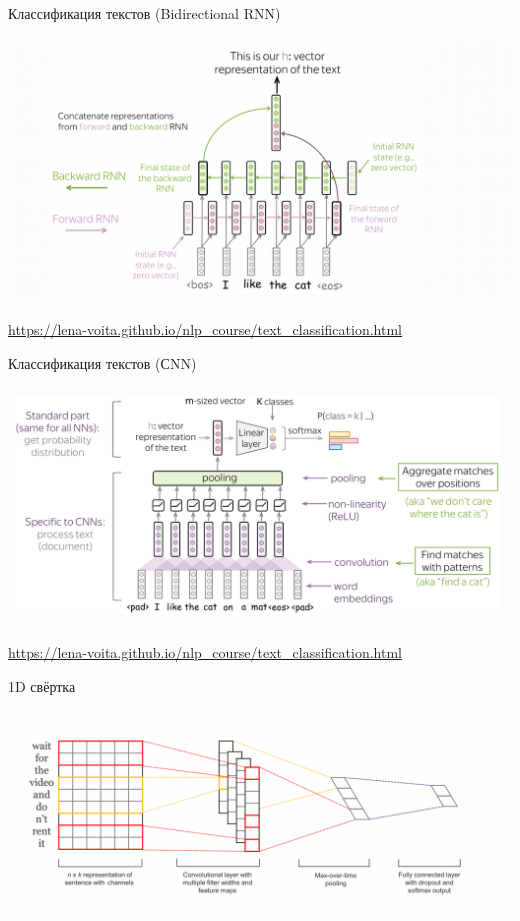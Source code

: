 \documentclass[notes,12pt, aspectratio=169]{beamer}
\begin{document}
\begin{frame}{Классификация текстов (Bidirectional RNN)}
	\begin{center}
		\includegraphics[width=.85\linewidth]{bidir_clf.png}
	\end{center}
	
	\vfill
	\footnotesize  {\color{blue} \url{https://lena-voita.github.io/nlp_course/text_classification.html}} 
\end{frame} 


\begin{frame}{Классификация текстов (СNN)}
	\begin{center}
		\includegraphics[width=.85\linewidth]{cnn_clf_t.png}
	\end{center}
	
	\vfill
	\footnotesize  {\color{blue} \url{https://lena-voita.github.io/nlp_course/text_classification.html}} 
\end{frame} 


\begin{frame}{1D свёртка}
\begin{center}
	\includegraphics[width=.99\linewidth]{1d_conv.png}
\end{center}
\end{frame} 
\end{document}
